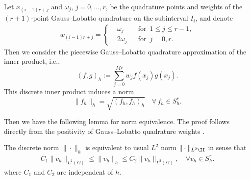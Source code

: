 Let $x_{(i-1)r+j}$ and { $\omega _{j}$}, $j=0,\dots,r$, be the quadrature
points and weights of the $(r+1)$-point Gauss--Lobatto quadrature on the subinterval $I_i$, and denote
\begin{align*}
w_{(i-1)r+j} =
\left\{
\begin{aligned}
&\omega_j &&\mbox{for}\,\,\, 1\le j\le r-1,\\
&2\omega_j &&\mbox{for}\,\,\, j=0, r.
\end{aligned}
\right.
\end{align*}
Then  we consider the piecewise Gauss--Lobatto quadrature approximation of the inner product, i.e.,
$$
(f,g)_h
:=  \sum_{j=0}^{Mr} w_j f(x_j) g(x_j)  .
$$
This discrete inner product induces a norm
$$
\|f_h\|_h=\sqrt{(f_h,f_h)_h} \quad\forall\, f_h\in S_h^r.
$$

Then we have the following lemma for norm equivalence. The proof follows directly from the positivity of
{Gauss--Lobatto} quadrature weights \cite[p. 426]{Quarteroni:2000}.


\begin{lemma}\label{lem:norm-equivalence}
The discrete norm $\| \cdot \|_h$ is equivalent to usual $L^2$ norm $\| \cdot \|_{L^2\II}$ in sense that
\begin{align*}%
 C_1 \|v_h\|_{L^2(\Omega)} \le \|v_h\|_h \le  C_2 \|v_h\|_{L^2(\Omega)} ,\quad \forall v_h\in S_h^r.
\end{align*}
where $C_1$ and $C_2$ are independent of $h$.
\end{lemma}

